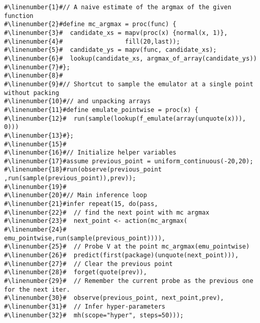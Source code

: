 \begin{mdframed}
\begin{minipage}{\linewidth}
\small
\belowcaptionskip=-10pt
\begin{lstlisting}[caption={Bayesian optimization with Gaussian drift
proposals},mathescape,numbers=none,label=alg:drift_bayesopt,escapechar=\#]
#\linenumber{1}#// A naive estimate of the argmax of the given function
#\linenumber{2}#define mc_argmax = proc(func) {
#\linenumber{3}#  candidate_xs = mapv(proc(x) {normal(x, 1)},
#\linenumber{4}#                 fill(20,last));
#\linenumber{5}#  candidate_ys = mapv(func, candidate_xs);
#\linenumber{6}#  lookup(candidate_xs, argmax_of_array(candidate_ys))
#\linenumber{7}#};
#\linenumber{8}#
#\linenumber{9}#// Shortcut to sample the emulator at a single point without packing
#\linenumber{10}#// and unpacking arrays
#\linenumber{11}#define emulate_pointwise = proc(x) {
#\linenumber{12}#  run(sample(lookup(f_emulate(array(unquote(x))), 0)))
#\linenumber{13}#};
#\linenumber{15}#
#\linenumber{16}#// Initialize helper variables
#\linenumber{17}#assume previous_point = uniform_continuous(-20,20);
#\linenumber{18}#run(observe(previous_point ,run(sample(previous_point)),prev));
#\linenumber{19}#
#\linenumber{20}#// Main inference loop
#\linenumber{21}#infer repeat(15, do(pass,
#\linenumber{22}#  // find the next point with mc argmax
#\linenumber{23}#  next_point <- action(mc_argmax(
#\linenumber{24}#		        emu_pointwise,run(sample(previous_point)))),
#\linenumber{25}#  // Probe V at the point mc_argmax(emu_pointwise)
#\linenumber{26}#  predict(first(package)(unquote(next_point))),
#\linenumber{27}#  // Clear the previous point
#\linenumber{28}#  forget(quote(prev)),
#\linenumber{29}#  // Remember the current probe as the previous one for the next iter.
#\linenumber{30}#  observe(previous_point, next_point,prev),
#\linenumber{31}#  // Infer hyper-parameters
#\linenumber{32}#  mh(scope="hyper", steps=50)));
\end{lstlisting}

\end{minipage}
\end{mdframed}
